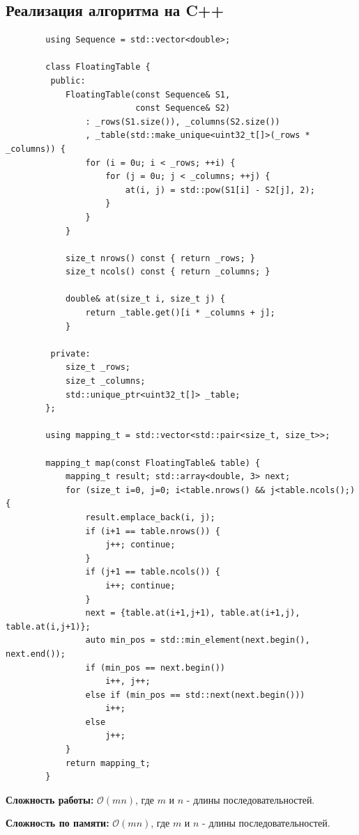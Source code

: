 \documentclass[12pt]{article}
\begin{document}
    \newpage
    \subsection{Реализация алгоритма на C++}
    \begin{lstlisting}
        using Sequence = std::vector<double>;

        class FloatingTable {
         public:
            FloatingTable(const Sequence& S1,
                          const Sequence& S2)
                : _rows(S1.size()), _columns(S2.size())
                , _table(std::make_unique<uint32_t[]>(_rows * _columns)) {
                for (i = 0u; i < _rows; ++i) {
                    for (j = 0u; j < _columns; ++j) {
                        at(i, j) = std::pow(S1[i] - S2[j], 2);
                    }
                }
            }

            size_t nrows() const { return _rows; }
            size_t ncols() const { return _columns; }

            double& at(size_t i, size_t j) {
                return _table.get()[i * _columns + j];
            }

         private:
            size_t _rows;
            size_t _columns;
            std::unique_ptr<uint32_t[]> _table;
        };

        using mapping_t = std::vector<std::pair<size_t, size_t>>;

        mapping_t map(const FloatingTable& table) {
            mapping_t result; std::array<double, 3> next;
            for (size_t i=0, j=0; i<table.nrows() && j<table.ncols();) {
                result.emplace_back(i, j);
                if (i+1 == table.nrows()) {
                    j++; continue;
                }
                if (j+1 == table.ncols()) {
                    i++; continue;
                }
                next = {table.at(i+1,j+1), table.at(i+1,j), table.at(i,j+1)};
                auto min_pos = std::min_element(next.begin(), next.end());
                if (min_pos == next.begin())
                    i++, j++;
                else if (min_pos == std::next(next.begin()))
                    i++;
                else
                    j++;
            }
            return mapping_t;
        }
    \end{lstlisting}

    \textbf{Сложность работы:} $\mathcal{O}(mn)$, где $m$ и $n$ - длины последовательностей.

    \textbf{Сложноcть по памяти:} $\mathcal{O}(mn)$, где $m$ и $n$ - длины последовательностей.
\end{document}
